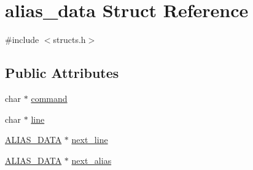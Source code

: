 \hypertarget{structalias__data}{\section{alias\-\_\-data Struct Reference}
\label{structalias__data}
}


{\ttfamily \#include $<$structs.\-h$>$}

\subsection*{Public Attributes}
\begin{DoxyCompactItemize}
\item 
char $\ast$ \hyperlink{structalias__data_aacc66e9add04da6d9cf229bc4096f8b2}{command}
\item 
char $\ast$ \hyperlink{structalias__data_a2f7beff3bfaffb4d5db211fe31046ab3}{line}
\item 
\hyperlink{structs_8h_a9e91d84870744ab3d5ffd36db5e074e9}{A\-L\-I\-A\-S\-\_\-\-D\-A\-T\-A} $\ast$ \hyperlink{structalias__data_a896cbb452e23a405fa4314864f29bfcb}{next\-\_\-line}
\item 
\hyperlink{structs_8h_a9e91d84870744ab3d5ffd36db5e074e9}{A\-L\-I\-A\-S\-\_\-\-D\-A\-T\-A} $\ast$ \hyperlink{structalias__data_a24281405b5307efa5c6eb370159bcfbc}{next\-\_\-alias}
\end{DoxyCompactItemize}


